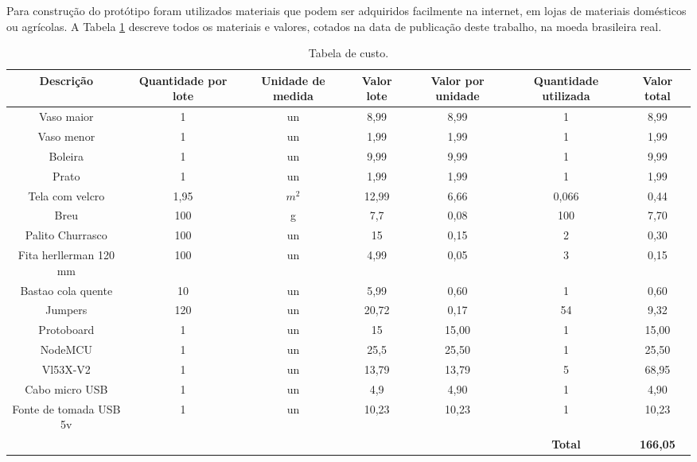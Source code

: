 \documentclass[
	12pt,				%
	openright,			%
	oneside,			%
	a4paper,			%
	chapter=TITLE,		%
	english,			%
	brazil				%
	]{abntex2}
\begin{document}
Para construção do protótipo foram utilizados materiais que podem ser adquiridos facilmente na internet, em lojas de materiais domésticos ou agrícolas.
A Tabela \ref{tab:custos} descreve todos os materiais e valores, cotados na data de publicação deste trabalho, na moeda brasileira real.

\begin{center}     
        \begin{table}[H]
            \caption{Tabela de custo.}
            \label{tab:custos} 
            \begin{adjustbox}{width=\textwidth}  
        \begin{tabular}{ |c|c|c|c|c|c|c| }                           
            \hline
            \rowcolor{lightgray} \textbf{Descrição} & \textbf{Quantidade por lote} & \textbf{Unidade de medida} & \textbf{Valor lote} & \textbf{Valor por unidade} & \textbf{Quantidade utilizada} & \textbf{Valor total} \\
            \hline
            Vaso maior & 1 & un & 8,99 & 8,99 & 1 & 8,99 \\
            \hline
            Vaso menor & 1 & un & 1,99 & 1,99 & 1 & 1,99 \\
            \hline
            Boleira & 1 & un & 9,99 & 9,99 & 1 & 9,99 \\
            \hline
            Prato & 1 & un & 1,99 & 1,99 & 1 & 1,99 \\
            \hline
            Tela com velcro & 1,95 & $m^{2}$ & 12,99 & 6,66 & 0,066 & 0,44 \\
            \hline
            Breu & 100 & g & 7,7 & 0,08 & 100 & 7,70 \\
            \hline
            Palito Churrasco & 100 & un & 15 & 0,15 & 2 & 0,30 \\
            \hline
            Fita herllerman 120 mm & 100 & un & 4,99 & 0,05 & 3 & 0,15 \\
            \hline
            Bastao cola quente & 10 & un & 5,99 & 0,60 & 1 & 0,60 \\
            \hline
            Jumpers & 120 & un & 20,72 & 0,17 & 54 & 9,32 \\
            \hline
            Protoboard & 1 & un & 15 & 15,00 & 1 & 15,00 \\
            \hline
            NodeMCU & 1 & un & 25,5 & 25,50 & 1 & 25,50 \\
            \hline
            Vl53X-V2 & 1 & un & 13,79 & 13,79 & 5 & 68,95 \\
            \hline
            Cabo micro USB & 1 & un & 4,9 & 4,90 & 1 & 4,90 \\
            \hline
            Fonte de tomada USB 5v & 1 & un & 10,23 & 10,23 & 1 & 10,23 \\
            \hline           
            &  &  &  &  & \textbf{Total} & \textbf{166,05} \\
            \hline
        \end{tabular}  
    \end{adjustbox}
    \end{table}    
\end{center}
\end{document}
